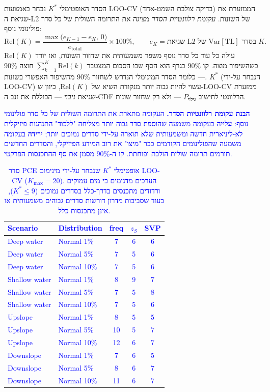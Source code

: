 \documentclass[12pt,a4paper]{article}
\newcommand{\Var}{\mathrm{Var}}
\newcommand{\TL}{\mathrm{TL}}
\DeclareRobustCommand{\aiedit}[1]{\textcolor{blue}{#1}}
\begin{document}
הסדר האופטימלי $K^*$ נבחר באמצעות \textenglish{LOO-CV} (בדיקה צולבת השמט-אחד)
הממזערת את שגיאת ה-L2 של השונות.
\emph{עקומת רלוונטיות הסדר} מציגה את התרומה השולית של כל סדר פולינומי נוסף:
\begin{equation}
  \mathrm{Rel}(K) = \frac{\max\!\bigl(e_{K-1}-e_K,\,0\bigr)}{e_{\mathrm{total}}}\times 100\%,
  \qquad
  e_K = \text{שגיאת L2 של } \Var[\TL] \text{ בסדר } K.
  \label{eq:relevance}
\end{equation}
$\mathrm{Rel}(K)$ עולה כל עוד כל סדר נוסף משפר משמעותית את שחזור השונות,
ואז יורד כשהשיפור מוצה.
קו 90\%{} בגרף הוא הסף שבו הסכום המצטבר $\sum_{k=1}^K \mathrm{Rel}(k)$ חוצה 90\%{} —
כלומר הסדר המינימלי הנדרש לשחזור 90\%{} מהשיפור האפשרי בשונות.
$K^*$ (הנבחר על-ידי \textenglish{LOO-CV}) עשוי להיות גבוה יותר מנקודת השיא של $\mathrm{Rel}(K)$,
כיוון ש-\textenglish{LOO-CV} ממזערת שגיאת \emph{ניבוי} — הכוללת את זנב ה-CDF הרלוונטי
לחישוב $P_\text{גילוי}$ — ולא רק שחזור שונות.

\aiedit{\textbf{הבנת עקומת רלוונטיות הסדר.} העקומה מתארת את התרומה השולית של כל סדר
פולינומי נוסף: \textbf{עלייה} בעקומה משמעה שהוספת סדר גבוה יותר מצליחה "ללכוד" התנהגות
פיזיקלית לא-ליניארית חדשה ומשמעותית שלא תוארה על-ידי סדרים נמוכים יותר; \textbf{ירידה}
בעקומה משמעה שהפולינומים הקודמים כבר "מיצו" את רוב המידע הפיזיקלי, והסדרים החדשים
תורמים תרומה שולית הולכת ופוחתת. קו ה-90\%{} מסמן את סף ההתכנסות הפרקטי.}

\aiedit{
\begin{table}[H]
  \centering
  \caption{סדר PCE אופטימלי $K^*$ שנבחר על-ידי מינימום \textenglish{LOO-CV} ($K_{\max}=20$).
           הערכים מדגימים כי מים עמוקים ורדודים מתכנסים בדרך-כלל בסדרים נמוכים ($K^*\leq 9$),
           בעוד שסביבות מדרון דורשות סדרים גבוהים משמעותית או אינן מתכנסות כלל.}
  \label{tab:pce_k_star}
  \begin{english}
  \begin{tabular}{llccc}
    \toprule
    Scenario & Distribution & freq & $z_S$ & SVP \\
    \midrule
    Deep water & Normal 1\% & 7 & 6 & 6 \\
    Deep water & Normal 5\% & 7 & 5 & 6 \\
    Deep water & Normal 10\% & 7 & 5 & 6 \\
    \midrule
    Shallow water & Normal 1\% & 8 & 9 & 7 \\
    Shallow water & Normal 5\% & 7 & 5 & 8 \\
    Shallow water & Normal 10\% & 7 & 5 & 6 \\
    \midrule
    Upslope & Normal 1\% & 8 & 5 & 5 \\
    Upslope & Normal 5\% & 10 & 5 & 7 \\
    Upslope & Normal 10\% & 12 & 6 & 7 \\
    \midrule
    Downslope & Normal 1\% & 7 & 6 & 5 \\
    Downslope & Normal 5\% & 8 & 6 & 7 \\
    Downslope & Normal 10\% & 11 & 6 & 7 \\
    \bottomrule
  \end{tabular}
  \end{english}
\end{table}}
\end{document}
